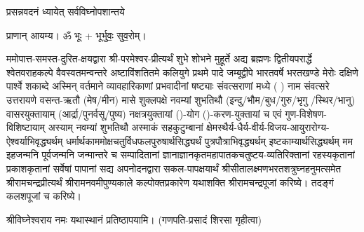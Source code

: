 
\setlength{\parindent}{0pt}





{प्रसन्नवदनं ध्यायेत् सर्वविघ्नोपशान्तये}
 
प्राणान्  आयम्य।  ॐ भूः + भूर्भुवः॒ सुव॒रोम्।


ममोपात्त-समस्त-दुरित-क्षयद्वारा श्री-परमेश्वर-प्रीत्यर्थं शुभे शोभने मुहूर्ते अद्य ब्रह्मणः
द्वितीयपरार्द्धे श्वेतवराहकल्पे वैवस्वतमन्वन्तरे अष्टाविंशतितमे कलियुगे प्रथमे पादे
जम्बूद्वीपे भारतवर्षे भरतखण्डे मेरोः दक्षिणे पार्श्वे शकाब्दे अस्मिन् वर्तमाने व्यावहारिकाणां प्रभवादीनां षष्ट्याः संवत्सराणां मध्ये (	) नाम संवत्सरे उत्तरायणे वसन्त-ऋतौ  (मेष/मीन) मासे 
शुक्लपक्षे नवम्यां शुभतिथौ (इन्दु/भौम/बुध/गुरु/भृगु /स्थिर/भानु) वासरयुक्तायाम्
(आर्द्रा/पुनर्वसू/पुष्य) नक्षत्रयुक्तायां ()-योग ()-करण-युक्तायां च एवं गुण-विशेषण-विशिष्टायाम्
अस्याम् नवम्यां शुभतिथौ अस्माकं सहकुटुम्बानां क्षेमस्थैर्य-धैर्य-वीर्य-विजय-आयुरारोग्य-ऐश्वर्याभिवृद्ध्यर्थम्
 धर्मार्थकाममोक्ष\-चतुर्विधफलपुरुषार्थसिद्ध्यर्थं पुत्रपौत्राभिवृद्ध्यर्थम् इष्टकाम्यार्थसिद्ध्यर्थम्
मम इहजन्मनि पूर्वजन्मनि जन्मान्तरे च सम्पादितानां ज्ञानाज्ञानकृतमहा\-पातकचतुष्टय-व्यतिरिक्तानां रहस्यकृतानां प्रकाशकृतानां सर्वेषां पापानां सद्य अपनोदनद्वारा सकल-पापक्षयार्थं 
श्रीसीतालक्ष्मणभरतशत्रुघ्नहनुमत्समेत श्रीरामचन्द्रप्रीत्यर्थं
श्रीरामनवमीपुण्यकाले कल्पोक्तप्रकारेण यथाशक्ति श्रीरामचन्द्रपूजां
करिष्ये।
तदङ्गं कलशपूजां च करिष्ये।


श्रीविघ्नेश्वराय नमः यथास्थानं प्रतिष्ठापयामि।
(गणपति-प्रसादं शिरसा गृहीत्वा)












 

